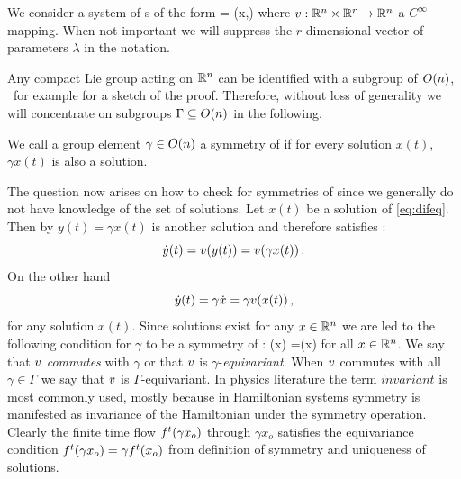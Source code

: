 \renewcommand{\inputfile}{\version\ - Predrag edited 2009-02-28 symODEs}


We consider a system of \ode s of the form
\beq
	 = \vf(x,\lambda)
	\label{eq:difeq}
\eeq
where $v: \mathbb{R}^{n}\times\mathbb{R}^{r} \rightarrow \mathbb{R}^{n}$ a $C^\infty$ mapping. When
not important we will suppress the $r$-dimensional vector of parameters
$\lambda$ in the notation.

Any compact Lie group acting on $\mathbb{R}^{n}$ can be identified
with a subgroup of $O(n)$, \cf\ for example 
for a sketch of the proof. Therefore, without loss of generality
we will concentrate on subgroups $\Gamma\subseteq O(n)$ in the following.


\begin{definition}
\label{def:symmetry}
We call a group element $\gamma\in O(n)$ a symmetry of  if for every solution
$x(t)$, $\gamma x(t)$ is also a solution.
\end{definition}

The question now arises on how to check for symmetries of  since
we generally do not have knowledge of the set of solutions. Let $x(t)$ be a solution
of \ref{eq:difeq}. Then by  $y(t)=\gamma x(t)$ is another solution
and therefore satisfies :
\[
 \dot{y}(t)=v{(y(t))}=v(\gamma x(t))\,.
\]
On the other hand
\[
 \dot{y}(t)=\gamma \dot{x} = \gamma v(x(t))\,,
\]
for any solution $x(t)$. Since solutions exist for any $x\in\mathbb{R}^{n}$ we are led to the following
condition for $\gamma$ to be a symmetry of :
\beq
	\vf(\gamma x) =\gamma \vf(x)
	\label{eq:equiv}
\eeq
for all $x\in\mathbb{R}^{n}$. We say that $v$ \emph{commutes} with $\gamma$ or that $v$ is $\gamma$-\emph{equivariant}.
When $v$ commutes with all $\gamma\in\Gamma$ we say that $v$ is $\Gamma$-equivariant.
In physics literature the term $invariant$ is most commonly used, mostly because in Hamiltonian systems
symmetry is manifested as invariance of the Hamiltonian under the symmetry operation.
Clearly the finite time flow ${f^{t}(\gamma x_o)}$ through $\gamma x_o$
satisfies the equivariance condition ${f^{t}(\gamma x_o)}=\gamma {f^{t}(x_o)}$ from
definition of symmetry and uniqueness of solutions.


